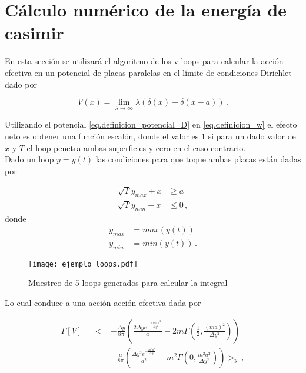 \section{Cálculo numérico de la energía de casimir}


En esta sección se utilizará el algoritmo de los v loops para calcular la acción efectiva en un potencial de placas paralelas en el límite de condiciones Dirichlet dado por

\begin{equation}
V(x) = \lim _{\lambda \rightarrow \infty} \lambda \left( \delta (x) + \delta ( x - a) \right)
\, .
\label{eq.definicion_potencial_D}
\end{equation}

Utilizando el potencial \eqref{eq.definicion_potencial_D} en \eqref{eq.definicion_w} el efecto neto es obtener una función escalón, donde el valor es $1$ si para un dado valor de $x$ y $T$ el loop penetra ambas superficies y cero en el caso contrario. \\


Dado un loop $y = y(t)$ las condiciones para que toque ambas placas están dadas por

\begin{align}
\label{condiciones}
\sqrt{T} y_{max} + x & \geq a \\
\sqrt{T} y_{min} + x & \leq 0 \, ,
\nonumber
\end{align}
donde 
\begin{align*}
y_{max}  &= max(y(t)) \\
y_{min}  &= min(y(t)) \, .
\end{align*}




\begin{figure}
    \centering
    \texttt{[image: ejemplo\_loops.pdf]}
    \caption{Muestreo de 5 loops generados para calcular la integral}
    \label{fig:ejemplo_loops}
\end{figure}



Lo cual conduce a una acción acción efectiva dada por

\begin{align}
\label{ec1.accion_efectiva}
\Gamma \left[ V \right] = 
 \Bigg<
&- \frac{\Delta y}{8 \pi}
	\left(
		\frac{2 \Delta y e^{-\frac{(m a)^2}{\Delta y ^2}}}{a}
		-2 m \Gamma \left( \frac{1}{2}, \frac{(m a)^2}{\Delta y ^2} \right)
	\right) \\
	&-  \frac{a}{8 \pi}
	\left(
		\frac{\Delta y ^2 e^{-\frac{m^2 a^2}{\Delta y^2}}}{a^2} -
		m^2 \Gamma \left( 0, \frac{m^2 a^2}{\Delta y ^2} \right)
	\right)	
\Bigg> _{y} 
\, ,
\nonumber
\end{align}

